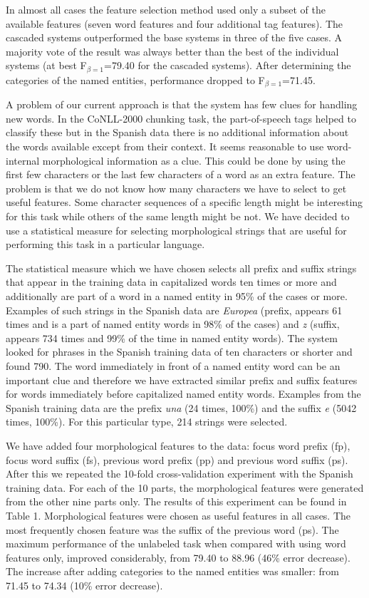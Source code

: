 \documentclass[11pt]{article}
\begin{document}
In almost all cases the feature selection method used only a subset of
the available features (seven word features and four additional tag
features).
The cascaded systems outperformed the base systems in three of the
five cases.
A majority vote of the result was always better than the best of the
individual systems (at best F$_{\beta=1}$=79.40 for the cascaded
systems).
After determining the categories of the named entities, performance
dropped to F$_{\beta=1}$=71.45.

A problem of our current approach is that the system has few clues
for handling new words.
In the CoNLL-2000 chunking task, the part-of-speech tags helped to
classify these but in the Spanish data there is no additional
information about the words available except from their context.
It seems reasonable to use word-internal morphological information as
a clue.
This could be done by using the first few characters or the last few
characters of a word as an extra feature.
The problem is that we do not know how many characters we have to
select to get useful features.
Some character sequences of a specific length might be interesting for
this task while others of the same length might be not.
We have decided to use a statistical measure for selecting
morphological strings that are useful for performing this task in a
particular language.

The statistical measure which we have chosen selects all prefix and
suffix strings that appear in the training data in capitalized words
ten times or more and additionally are part of a word in a named
entity in 95\% of the cases or more.
Examples of such strings in the Spanish data are {\it Europea}
(prefix, appears 61 times and is a part of named entity words in 98\%
of the cases) and {\it z} (suffix, appears 734 times and 99\% of the
time in named entity words).
The system looked for phrases in the Spanish training data of ten
characters or shorter and found 790.
The word immediately in front of a named entity word can be an important
clue and therefore we have extracted similar prefix and suffix
features for words immediately before capitalized named entity words.
Examples from the Spanish training data are the prefix {\it una}
(24 times, 100\%) and the suffix {\it e} (5042 times, 100\%).
For this particular type, 214 strings were selected.

We have added four morphological features to the data: focus word
prefix (fp), focus word suffix (fs), previous word prefix (pp) and
previous word suffix (ps).
After this we repeated the 10-fold cross-validation experiment with
the Spanish training data.
For each of the 10 parts, the morphological features were generated
from the other nine parts only.
The results of this experiment can be found in Table 1.
Morphological features were chosen as useful features in all cases.
The most frequently chosen feature was the suffix of the previous
word (ps).
The maximum performance of the unlabeled task when compared with using
word features only, improved considerably, from 79.40 to 88.96 (46\%
error decrease).
The increase after adding categories to the named entities was
smaller: from 71.45 to 74.34 (10\% error decrease).
\end{document}
